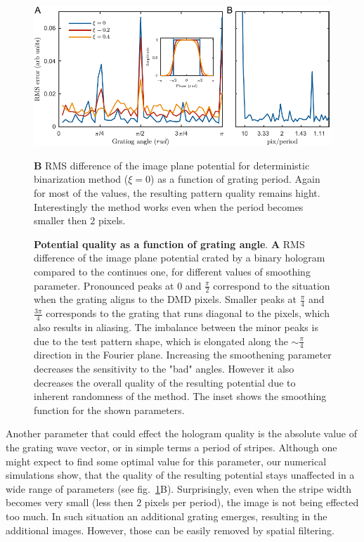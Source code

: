 \begin{figure}[t]
	\centering
	\includegraphics[scale=1]{figures/DMD_K_rotation_v3.pdf}
	\caption{{\bf Potential quality as a function of grating angle}. {\bf A} RMS difference of the image plane potential crated by a binary hologram compared to the continues one, for different values of smoothing parameter. Pronounced peaks at $0$ and $\frac{\pi}{2}$ correspond to the situation when the grating aligns to the DMD pixels. Smaller peaks at $\frac{\pi}{4}$ and $\frac{3\pi}{4}$ corresponds to the grating that runs diagonal to the pixels, which also results in aliasing. The imbalance between the minor peaks is due to the test pattern shape, which is elongated along the $\sim \frac{\pi}{4}$ direction in the Fourier plane. Increasing the smoothening parameter decreases the sensitivity to the "bad" angles. However it also decreases the overall quality of the resulting potential due to inherent randomness of the method. The inset shows the smoothing function for the shown parameters.} {\bf B} RMS difference of the image plane potential for deterministic binarization method ($\xi = 0$) as a function of grating period. Again for most of the values, the resulting pattern quality remains hight. Interestingly the method works even when the period becomes smaller then $2$ pixels.  
	\label{fig:DMD_K_rotation}
\end{figure}
 
Another parameter that could effect the hologram quality is the absolute value of the grating wave vector, or in simple terms a period of stripes. Although one might expect to find some optimal value for this parameter, our numerical simulations show, that the quality of the resulting potential stays unaffected in a wide range of parameters (see fig.~\ref{fig:DMD_K_rotation}B). Surprisingly, even when the stripe width becomes very small (less then $2$ pixels per period),  the image is not being effected too much. In such situation an additional grating emerges, resulting in the additional images. However, those can be easily removed by spatial filtering.
 
